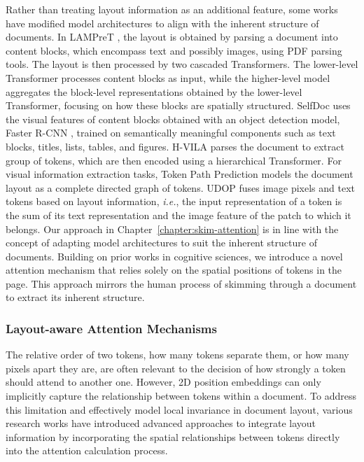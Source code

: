 Rather than treating layout information as an additional feature, some works have modified model architectures to align with the inherent structure of documents. In \ac{LAMPreT} \citep{wu2021lampret}, the layout is obtained by parsing a document into content blocks, which encompass text and possibly images, using PDF parsing tools. The layout is then processed by two cascaded Transformers. The lower-level Transformer processes content blocks as input, while the higher-level model aggregates the block-level representations obtained by the lower-level Transformer, focusing on how these blocks are spatially structured. SelfDoc \citep{li2021selfdoc} uses the visual features of content blocks obtained with an object detection model, Faster R-CNN \citep{ren2015faster}, trained on semantically meaningful components such as text blocks, titles, lists, tables, and figures. H-VILA \citep{shen2022vila} parses the document to extract group of tokens, which are then encoded using a hierarchical Transformer. For visual information extraction tasks, Token Path Prediction \citep{zhang2023reading} models the document layout as a complete directed graph of tokens. UDOP \citep{tang2023unifying} fuses image pixels and text tokens based on layout information, \textit{i.e.}, the input representation of a token is the sum of its text representation and the image feature of the patch  to which it belongs. Our approach in Chapter~\ref{chapter:skim-attention} is in line with the concept of adapting model architectures to suit the inherent structure of documents. Building on prior works in cognitive sciences, we introduce a novel attention mechanism that relies solely on the spatial positions of tokens in the page. This approach mirrors the human process of skimming through a document to extract its inherent structure.


\subsubsection{Layout-aware Attention Mechanisms}
\label{section:related-document-understanding-layout-aware-attention}

The relative order of two tokens, how many tokens separate them, or how many pixels apart they are, are often relevant to the decision of how strongly a token should attend to another one. However, 2D position embeddings can only implicitly capture the relationship between tokens within a document. To address this limitation and effectively model local invariance in document layout, various research works have introduced advanced approaches to integrate layout information by incorporating the spatial relationships between tokens directly into the attention calculation process.

